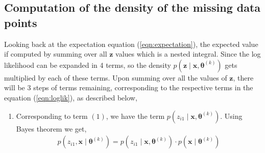 \documentclass[12pt]{article}
\newcommand{\bx}{\ensuremath{\mathbf{x}}}
\newcommand{\bz}{\ensuremath{\mathbf{z}}}
\newcommand{\btheta}{\ensuremath{\boldsymbol{\theta}}}
\begin{document}
\subsection{Computation of the density of the missing data points}
Looking back at the expectation equation (\ref{eqn:expectation}), the expected value if computed by summing over all $\bz$ values which is a nested integral. Since the log likelihood can be expanded in 4 terms, so the density $p(\bz \mid \bx, \btheta^{(k)})$ gets multiplied by each of these terms. Upon summing over all the values of $\bz$, there will be 3 steps of terms remaining, corresponding to the respective terms in the equation (\ref{eqn:loglik}), as described below,
\begin{enumerate}
\item Corresponding to term $(1)$, we have the term $p(z_{i1} \mid \bx, \btheta^{(k)})$. Using Bayes theorem we get,
\begin{align}
p(z_{i1}, \bx \mid \btheta^{(k)}) = p(z_{i1} \mid \bx, \btheta^{(k)}) \cdot p(\bx \mid \btheta^{(k)})
\end{align}
\end{enumerate}
\end{document}
